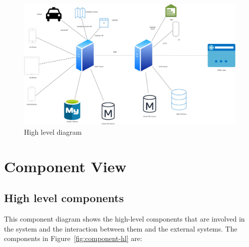 \documentclass{Configuration_Files/PoliMi3i_thesis}
\begin{document}
\begin{figure}[H]
    \centering
    \includegraphics[width=1\textwidth]{Images/high-level/Overview-3.jpg}
    \caption{High level diagram}
\end{figure}

\section{Component View}

\subsection{High level components}

This component diagram shows the high-level components that are involved in the system and the interaction between them and the external systems. The components in Figure~\ref{fig:component-hl} are:
\end{document}

